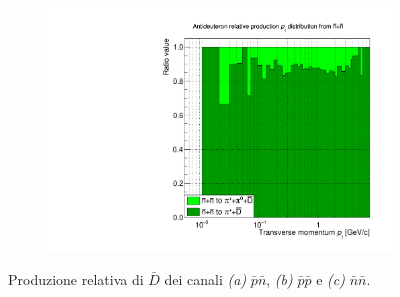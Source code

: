 \begin{figure}[htbp]
\begin{subfigure}{.49\textwidth}
    \centering
        \includegraphics[width=\textwidth]{image/3-risultati/antideuteron_analyse/A/n_n_stack.pdf}
        \caption{}
        \label{fig:A_nn_stack_antideut}
    \end{subfigure}
    \caption{Produzione relativa di $\bar D$ dei canali \emph{\rmfamily (a)} $\bar p\bar n$, \emph{\rmfamily (b)} $\bar p\bar p$ e \emph{\rmfamily (c)} $\bar n\bar n$.}
    \label{fig:A_antideut_subchannels}
\end{figure}